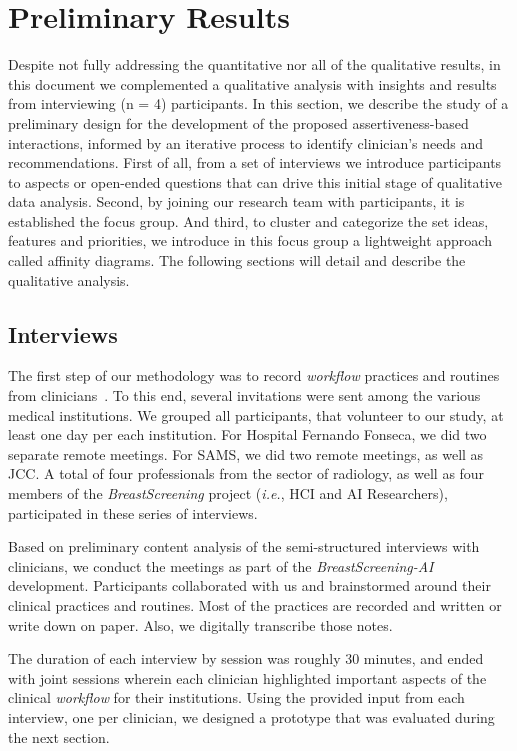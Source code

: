 \section{Preliminary Results}
\label{sec:sec005}

Despite not fully addressing the quantitative nor all of the qualitative results, in this document we complemented a qualitative analysis with insights and results from interviewing (n = 4) participants.
In this section, we describe the study of a preliminary design for the development of the proposed assertiveness-based interactions, informed by an iterative process to identify clinician's needs and recommendations.
First of all, from a set of interviews we introduce participants to aspects or open-ended questions that can drive this initial stage of qualitative data analysis.
Second, by joining our research team with participants, it is established the focus group.
And third, to cluster and categorize the set ideas, features and priorities, we introduce in this focus group a lightweight approach called affinity diagrams.
The following sections will detail and describe the qualitative analysis.

\subsection{Interviews}
\label{sec:sec00501}

The first step of our methodology was to record {\it workflow} practices and routines from clinicians~\cite{Hoiseth:2013:RGD:2468356.2468436}.
To this end, several invitations were sent among the various medical institutions.
We grouped all participants, that volunteer to our study, at least one day per each institution.
For Hospital Fernando Fonseca, we did two separate remote meetings.
For SAMS, we did two remote meetings, as well as JCC.
A total of four professionals from the sector of radiology, as well as four members of the {\it BreastScreening} project ({\it i.e.}, HCI and AI Researchers), participated in these series of interviews.

Based on preliminary content analysis of the semi-structured interviews with clinicians, we conduct the meetings as part of the {\it BreastScreening-AI} development.
Participants collaborated with us and brainstormed around their clinical practices and routines.
Most of the practices are recorded and written or write down on paper.
Also, we digitally transcribe those notes.

The duration of each interview by session was roughly 30 minutes, and ended with joint sessions wherein each clinician highlighted important aspects of the clinical {\it workflow} for their institutions.
Using the provided input from each interview, one per clinician, we designed a prototype that was evaluated during the next section.

